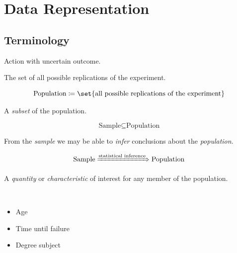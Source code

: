 \section{Data Representation}

\subsection{Terminology}

\begin{definition}
    Action with uncertain outcome.
\end{definition}

\begin{definition}[Population]
    The set of all possible replications of the experiment.
    
    \begin{equation}
        \text{Population} \coloneqq \set{ \text{all possible replications of the experiment} }
    \end{equation}
\end{definition}

\begin{definition}[Sample]
    A \textit{subset} of the population.
    
    \begin{equation}
        \text{Sample} \subseteq \text{Population}
    \end{equation}
\end{definition}

\begin{definition}
    From the \textit{sample} we may be able to \textit{infer} conclusions about the \textit{population}.
    
    \begin{equation}
        \text{Sample} \xRightarrow{\text{statistical inference}} \text{Population}
    \end{equation}
\end{definition}

\begin{definition}[Variable]
    A \textit{quantity} or \textit{characteristic} of interest for any member of the population.
\end{definition}

\begin{example}\
    \begin{itemize}
        \item Age
        \item Time until failure
        \item Degree subject
    \end{itemize}
\end{example}

